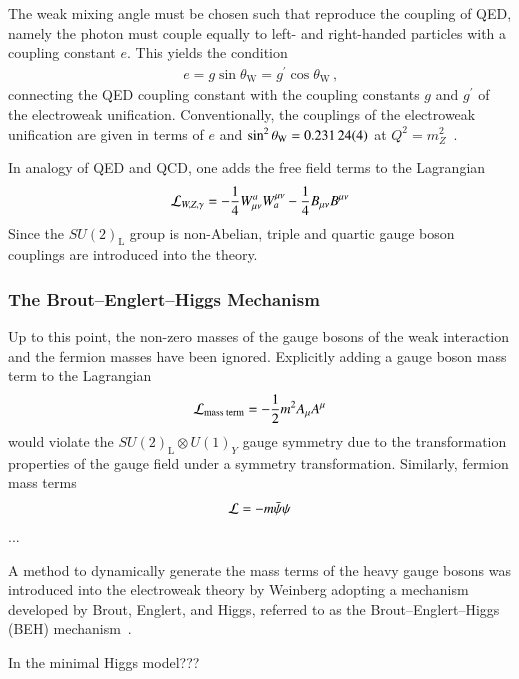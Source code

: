 The weak mixing angle must be chosen such that
 reproduce the
coupling of QED, namely the photon must couple equally to left- and right-handed
particles with a coupling constant $e$. This yields the condition
\begin{align*}
  e = g \sin\theta_{\text{W}} = g^\prime \cos\theta_{\text{W}} \,\text{,}
\end{align*}
connecting the QED coupling constant with the coupling constants $g$ and
$g^\prime$ of the electroweak unification. Conventionally, the couplings of the
electroweak unification are given in terms of $e$ and
$\sin^2\theta_{\text{W}} = \num{0.23124 +- 0.00004}$ at
$Q^2 = m_{Z}^2$~\cite{pdg2020}.

In analogy of QED and QCD, one adds the free field terms to the Lagrangian
\begin{align*}
  \mathcal{L}_{W, Z, \gamma} =
  - \frac{1}{4} W_{\mu\nu}^a W^{\mu\nu}_a
  - \frac{1}{4} B_{\mu\nu} B^{\mu\nu}
\end{align*}
Since the $SU(2)_{\text{L}}$ group is non-Abelian, triple and quartic gauge
boson couplings are introduced into the theory.


\subsubsection{The Brout--Englert--Higgs Mechanism}

Up to this point, the non-zero masses of the gauge bosons of the weak
interaction and the fermion masses have been ignored. Explicitly adding a gauge boson mass term to the Lagrangian
\begin{align*}
  \mathcal{L}_{\text{mass term}} = -\frac{1}{2} m^2 A_\mu A^\mu
\end{align*}
would violate the $SU(2)_{\text{L}} \otimes U(1)_Y$ gauge symmetry due to the
transformation properties of the gauge field under a symmetry
transformation. Similarly, fermion mass terms
\begin{align*}
  \mathcal{L} = - m \bar{\psi} \psi
\end{align*}
...

A method to dynamically generate the mass terms of the heavy gauge bosons was
introduced into the electroweak theory by Weinberg adopting a mechanism
developed by Brout, Englert, and Higgs, referred to as the Brout--Englert--Higgs
(BEH) mechanism~\cite{Englert:1964et,Higgs:1964pj}.

In the minimal Higgs model???

